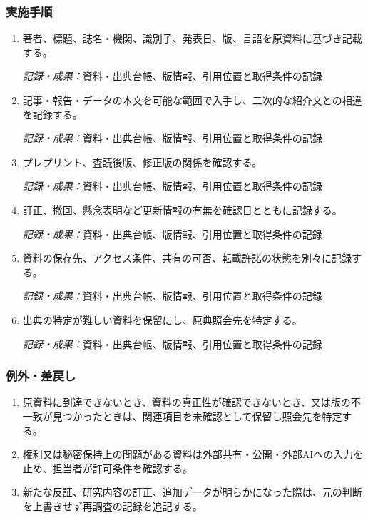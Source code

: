 \documentclass[a4paper,11pt]{article}
\begin{document}
\subsubsection*{実施手順}
\begin{enumerate}[leftmargin=2em,itemsep=0.65em]
\item 著者、標題、誌名・機関、識別子、発表日、版、言語を原資料に基づき記載する。\par\noindent\textit{記録・成果：}資料・出典台帳、版情報、引用位置と取得条件の記録\nobreak\smallskip
\item 記事・報告・データの本文を可能な範囲で入手し、二次的な紹介文との相違を記録する。\par\noindent\textit{記録・成果：}資料・出典台帳、版情報、引用位置と取得条件の記録\nobreak\smallskip
\item プレプリント、査読後版、修正版の関係を確認する。\par\noindent\textit{記録・成果：}資料・出典台帳、版情報、引用位置と取得条件の記録\nobreak\smallskip
\item 訂正、撤回、懸念表明など更新情報の有無を確認日とともに記録する。\par\noindent\textit{記録・成果：}資料・出典台帳、版情報、引用位置と取得条件の記録\nobreak\smallskip
\item 資料の保存先、アクセス条件、共有の可否、転載許諾の状態を別々に記録する。\par\noindent\textit{記録・成果：}資料・出典台帳、版情報、引用位置と取得条件の記録\nobreak\smallskip
\item 出典の特定が難しい資料を保留にし、原典照会先を特定する。\par\noindent\textit{記録・成果：}資料・出典台帳、版情報、引用位置と取得条件の記録\nobreak\smallskip
\end{enumerate}
\subsubsection*{例外・差戻し}
\begin{enumerate}[leftmargin=2em,itemsep=0.35em]
\item 原資料に到達できないとき、資料の真正性が確認できないとき、又は版の不一致が見つかったときは、関連項目を未確認として保留し照会先を特定する。
\item 権利又は秘密保持上の問題がある資料は外部共有・公開・外部AIへの入力を止め、担当者が許可条件を確認する。
\item 新たな反証、研究内容の訂正、追加データが明らかになった際は、元の判断を上書きせず再調査の記録を追記する。
\end{enumerate}
\end{document}
